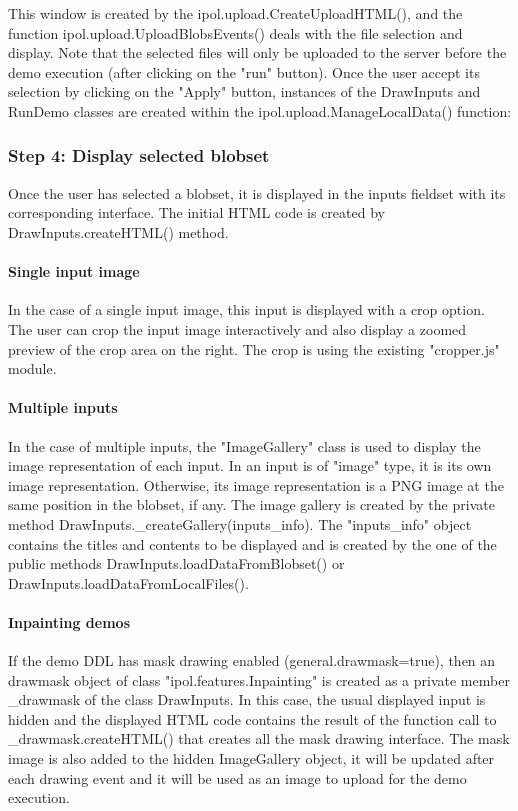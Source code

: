 This window is created by the ipol.upload.CreateUploadHTML(), and the function
ipol.upload.UploadBlobsEvents() deals with the file selection and display.
Note that the selected files will only be uploaded to the server before the
demo execution (after clicking on the "run" button).
Once the user accept its selection by clicking on the "Apply" button, 
instances of the DrawInputs and RunDemo classes are created within the 
ipol.upload.ManageLocalData() function:
%

\subsubsection{Step 4: Display selected blobset}
Once the user has selected a blobset, it is displayed in the inputs fieldset
with its corresponding interface.
The initial HTML code is created by DrawInputs.createHTML() method. 

\paragraph{Single input image}
In the case of a single input image, this input is displayed with a crop option.
The user can crop the input image interactively and also display a zoomed preview
of the crop area on the right. The crop is using the existing "cropper.js" module.

\paragraph{Multiple inputs}
In the case of multiple inputs, the "ImageGallery" class is used to display the 
image representation of each input. In an input is of "image" type, it is its own
image representation. Otherwise, its image representation is a PNG image at the same
position in the blobset, if any.
The image gallery is created by the private method DrawInputs.\_createGallery(inputs\_info).
The "inputs\_info" object contains the titles and contents to be displayed and is created
by the one of the public methods DrawInputs.loadDataFromBlobset() or DrawInputs.loadDataFromLocalFiles().

\paragraph{Inpainting demos}
If the demo DDL has mask drawing enabled (general.drawmask=true), then an drawmask object
of class "ipol.features.Inpainting" is created as a private member \_drawmask of the class
DrawInputs. In this case, the usual displayed input is hidden and the displayed HTML code
contains the result of the function call to \_drawmask.createHTML() that creates all 
the mask drawing interface. The mask image is also added to the hidden ImageGallery object,
it will be updated after each drawing event and it will be used as an image to upload
for the demo execution.

